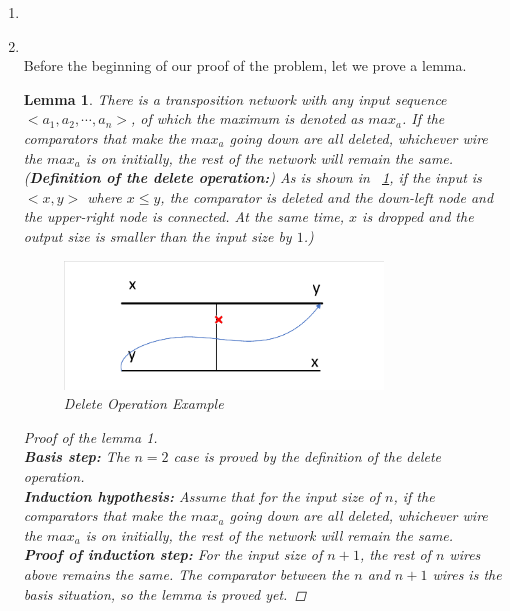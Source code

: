 \documentclass[12pt,a4paper]{article}
\makeatletter
\newtheorem{lemma}[theorem]{Lemma}
\newtheorem*{solution}{Solution}
\theoremstyle{definition}
\renewenvironment{solution}[1][Solution] {\par\pushQED{\qed}\normalfont\topsep6\p@\@plus6\p@\relax\trivlist\item[\hskip\labelsep\bfseries#1\@addpunct{.}]\ignorespaces}{\popQED\endtrivlist\@endpefalse} \makeatother
\makeatother
\begin{document}
\begin{enumerate}
\item
\begin{solution}
~\\
Before the beginning of our proof of the problem, let we prove a lemma. 
\begin{lemma}
There is a transposition network with any input sequence $<a_1,a_2,\cdots,a_n>$, of which the maximum is denoted as $max_a$. If the comparators that make the $max_a$ going down are all deleted, whichever wire the $max_a$ is on initially, the rest of the network will remain the same.\\ (\textbf{Definition of the delete operation:}) As is shown in ~\ref{Fig-DeleteExample}, if the input is $<x,y>$ where $x\leq y$, the comparator is deleted and the down-left node and the upper-right node is connected. At the same time, $x$ is dropped and the output size is smaller than the input size by $1$.)
\begin{figure}[htbp]
    \centering
    \includegraphics[width=0.8\textwidth]{Fig-DeleteExample.pdf}
    \caption{Delete Operation Example}\label{Fig-DeleteExample}
\end{figure}
\begin{proof}[Proof of the lemma 1]
~\\
\textbf{Basis step:} The $n=2$ case is proved by the definition of the delete operation. \\
\textbf{Induction hypothesis:} Assume that for the input size of $n$, if the comparators that make the $max_a$ going down are all deleted, whichever wire the $max_a$ is on initially, the rest of the network will remain the same.\\
\textbf{Proof of induction step:} For the input size of $n+1$, the rest of $n$ wires above remains the same. The comparator between the $n$ and $n+1$ wires is the basis situation, so the lemma is proved yet.


\end{proof}
\end{lemma}
\end{solution}
\end{enumerate}
\end{document}
